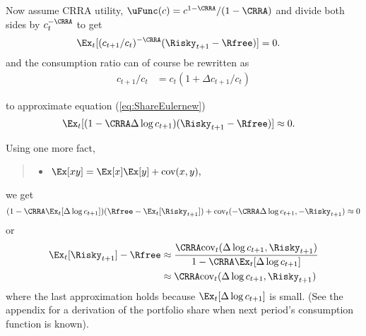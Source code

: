 \documentclass{\econtex}
\begin{document}
Now assume CRRA utility, $\uFunc(c) = c^{1-\CRRA}/(1-\CRRA)$ and divide both 
sides by $c_{t}^{-\CRRA}$ to get
\begin{equation}\begin{gathered}\begin{aligned}
\Ex_{t}[(c_{t+1}/c_{t})^{-\CRRA}(\Risky_{t+1}-\Rfree)] & =  0. \label{eq:ShareEulernew}
\end{aligned}\end{gathered}\end{equation}
and the consumption ratio can of course be rewritten as
\begin{align}
c_{t+1}/c_{t} & = c_{t}(1+\Delta c_{t+1}/c_{t})
\end{align}

\noindent to approximate equation (\ref{eq:ShareEulernew})
\begin{equation}\begin{gathered}\begin{aligned}
\Ex_{t}[(1-\CRRA \Delta \log {c}_{t+1})(\Risky_{t+1}-\Rfree)] & \approx  0.
\end{aligned}\end{gathered}\end{equation}

\noindent Using one more fact,
\begin{quote}
\begin{itemize}
\item $\Ex [xy] = \Ex [x]\Ex [y] + \text{cov}(x,y),$
\end{itemize}
\end{quote}
we get
\begin{equation}
(1-\CRRA \Ex_{t}[\Delta \log {c}_{t+1}])(\Rfree - \Ex_{t}[\Risky_{t+1}])+\text{cov}_{t}(-\CRRA \Delta \log {c}_{t+1},-\Risky_{t+1})  \approx  0  
\end{equation}
or
\begin{equation}\begin{gathered}\begin{aligned}
\Ex_{t}[\Risky_{t+1}]-\Rfree & \approx  \frac{\CRRA \text{cov}_{t}(\Delta \log {c}_{t+1},\Risky_{t+1})}{1-\CRRA \Ex_{t}[ \Delta \log {c}_{t+1}]} 
\\                             & \approx  \CRRA \text{cov}_{t}(\Delta \log {c}_{t+1},\Risky_{t+1}) \label{eq:eqprem}
\end{aligned}\end{gathered}\end{equation}
\noindent where the last approximation holds because $\Ex_{t}[\Delta 
\log {c}_{t+1}]$ is small.  (See the appendix for a derivation of the portfolio share when next period's consumption function is known).
\end{document}

